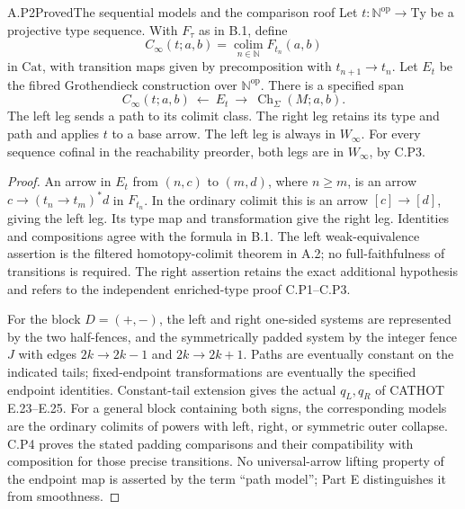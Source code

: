 \begin{result}{A.P2}{Proved}{The sequential models and the comparison roof}
Let $t:\mathbb N^{\mathrm{op}}\to\mathrm{Ty}$ be a projective type sequence. With $F_\tau$ as in B.1, define
\[
 C_\infty(t;a,b)=\operatorname*{colim}_{n\in\mathbb N}F_{t_n}(a,b)
\]
in $\mathrm{Cat}$, with transition maps given by precomposition with $t_{n+1}\to t_n$. Let $E_t$ be the fibred Grothendieck construction over $\mathbb N^{\mathrm{op}}$. There is a specified span
\[
 C_\infty(t;a,b)\ \longleftarrow\ E_t
       \ \longrightarrow\ \operatorname{Ch}_\Sigma(M;a,b).
\]
The left leg sends a path to its colimit class. The right leg retains its type and path and applies $t$ to a base arrow. The left leg is always in $W_\infty$. For every sequence cofinal in the reachability preorder, both legs are in $W_\infty$, by C.P3.
\end{result}
\begin{proof}
An arrow in $E_t$ from $(n,c)$ to $(m,d)$, where $n\geq m$, is an arrow $c\to(t_n\to t_m)^*d$ in $F_{t_n}$. In the ordinary colimit this is an arrow $[c]\to[d]$, giving the left leg. Its type map and transformation give the right leg. Identities and compositions agree with the formula in B.1. The left weak-equivalence assertion is the filtered homotopy-colimit theorem in A.2; no full-faithfulness of transitions is required. The right assertion retains the exact additional hypothesis and refers to the independent enriched-type proof C.P1--C.P3.

For the block $D=(+,-)$, the left and right one-sided systems are represented by the two half-fences, and the symmetrically padded system by the integer fence $J$ with edges $2k\to2k-1$ and $2k\to2k+1$. Paths are eventually constant on the indicated tails; fixed-endpoint transformations are eventually the specified endpoint identities. Constant-tail extension gives the actual $q_L,q_R$ of CATHOT E.23--E.25. For a general block containing both signs, the corresponding models are the ordinary colimits of powers with left, right, or symmetric outer collapse. C.P4 proves the stated padding comparisons and their compatibility with composition for those precise transitions. No universal-arrow lifting property of the endpoint map is asserted by the term ``path model''; Part E distinguishes it from smoothness.
\end{proof}
